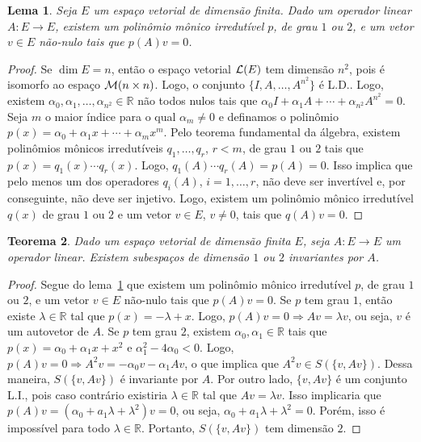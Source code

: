 \documentclass[12pt,a4paper]{article}
\newcommand{\R}{\mathbb{R}}
\newtheorem{thm}{Teorema}[section]
\newtheorem{lem}[thm]{Lema}
\theoremstyle{definition}
\begin{document}
\begin{lem}
  \label{thm:17}
  Seja $E$ um espaço vetorial de dimensão finita. Dado um operador
  linear $A:E\to E$, existem um polinômio mônico irredutível $p$, de
  grau $1$ ou $2$, e um vetor $v\in E$ não-nulo tais que $p(A)v=0$.
\end{lem}
\begin{proof}
  Se $\dim E=n$, então o espaço vetorial ${\cal L}(E)$ tem dimensão
  $n^2$, pois é isomorfo ao espaço ${\cal M}(n\times n)$. Logo, o
  conjunto $\{I,A,\ldots,A^{n^2}\}$ é L.D.. Logo, existem
  $\alpha_0,\alpha_1,\ldots,\alpha_{n^2}\in\R$ não todos nulos tais
  que $\alpha_0I+\alpha_1A+\cdots+\alpha_{n^2}A^{n^2}=0$. Seja $m$ o
  maior índice para o qual $\alpha_m\ne 0$ e definamos o polinômio
  $p(x)=\alpha_0+\alpha_1x+\cdots+\alpha_mx^m$. Pelo teorema
  fundamental da álgebra, existem polinômios mônicos irredutíveis
  $q_1,\ldots,q_r$, $r<m$, de grau $1$ ou $2$ tais que
  $p(x)=q_1(x)\cdots q_r(x)$. Logo, $q_1(A)\cdots q_r(A)=p(A)=0$. Isso
  implica que pelo menos um dos operadores $q_i(A)$, $i=1,\ldots,r$,
  não deve ser invertível e, por conseguinte, não deve ser
  injetivo. Logo, existem um polinômio mônico irredutível $q(x)$ de
  grau $1$ ou $2$ e um vetor $v\in E$, $v\ne 0$, tais que $q(A)v=0$.
\end{proof}

\begin{thm}
  Dado um espaço vetorial de dimensão finita $E$, seja $A:E\to E$ um
  operador linear. Existem subespaços de dimensão $1$ ou $2$
  invariantes por $A$.
\end{thm}
\begin{proof}
  Segue do lema~\ref{thm:17} que existem um polinômio mônico
  irredutível $p$, de grau $1$ ou $2$, e um vetor $v\in E$ não-nulo
  tais que $p(A)v=0$. Se $p$ tem grau $1$, então existe $\lambda\in\R$
  tal que $p(x)=-\lambda+x$. Logo, $p(A)v=0\Rightarrow Av=\lambda v$,
  ou seja, $v$ é um autovetor de $A$. Se $p$ tem grau $2$, existem
  $\alpha_0,\alpha_1\in\R$ tais que $p(x)=\alpha_0+\alpha_1x+x^2$ e
  $\alpha_1^2-4\alpha_0<0$. Logo,
  $p(A)v=0\Rightarrow A^2v=-\alpha_0v-\alpha_1Av$, o que implica que
  $A^2v\in S(\{v,Av\})$. Dessa maneira, $S(\{v,Av\})$ é invariante por
  $A$. Por outro lado, $\{v,Av\}$ é um conjunto L.I., pois caso
  contrário existiria $\lambda\in\R$ tal que $Av=\lambda v$. Isso
  implicaria que $p(A)v=(\alpha_0+ a_1\lambda+\lambda^2)v=0$, ou seja,
  $\alpha_0+ a_1\lambda+\lambda^2=0$. Porém, isso é impossível para
  todo $\lambda\in\R$. Portanto, $S(\{v,Av\})$ tem dimensão $2$.
\end{proof}
\end{document}
